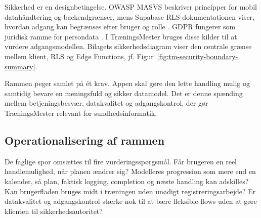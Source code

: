 Sikkerhed er en designbetingelse. OWASP MASVS beskriver principper for mobil datahåndtering og backendgrænser, mens Supabase RLS-dokumentationen viser, hvordan adgang kan begrænses efter bruger og rolle \cite{owasp2024_masvs,supabase_rls_docs,supabase_securing_api_docs}. GDPR fungerer som juridisk ramme for persondata \cite{europeanparliament2016_gdpr}. I TræningsMester bruges disse kilder til at vurdere adgangsmodellen. Bilagets sikkerhedsdiagram viser den centrale grænse mellem klient, RLS og Edge Functions, jf. Figur~\ref{fig:tm-security-boundary-summary}.

Rammen peger samlet på ét krav. Appen skal gøre den lette handling mulig og samtidig bevare en meningsfuld og sikker datamodel. Det er denne spænding mellem betjeningsbesvær, datakvalitet og adgangskontrol, der gør TræningsMester relevant for sundhedsinformatik.

\subsection{Operationalisering af rammen}

De faglige spor omsættes til fire vurderingsspørgsmål. Får brugeren en reel handlemulighed, når planen ændrer sig? Modelleres progression som mere end en kalender, så plan, faktisk logging, completion og næste handling kan adskilles? Kan brugerfladen bruges midt i træningen uden unødigt registreringsarbejde? Er datakvalitet og adgangskontrol stærke nok til at bære fleksible flows uden at gøre klienten til sikkerhedsautoritet?

